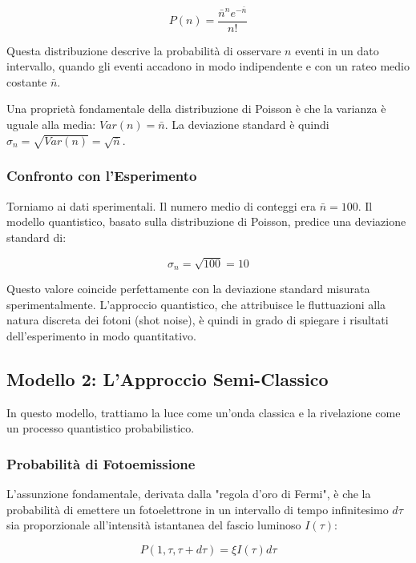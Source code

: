 \begin{equation}
 P(n) = \frac{\bar{n}^n e^{-\bar{n}}}{n!}
\end{equation}

Questa distribuzione descrive la probabilità di osservare $n$ eventi in un dato intervallo, quando gli eventi accadono in modo indipendente e con un rateo medio costante $\bar{n}$.

Una proprietà fondamentale della distribuzione di Poisson è che la varianza è uguale alla media:
$Var(n) = \bar{n}$.
La deviazione standard è quindi $\sigma_n = \sqrt{Var(n)} = \sqrt{\bar{n}}$.

\subsubsection*{Confronto con l'Esperimento}
Torniamo ai dati sperimentali. Il numero medio di conteggi era $\bar{n} = 100$. Il modello quantistico, basato sulla distribuzione di Poisson, predice una deviazione standard di:

\begin{equation}
 \sigma_n = \sqrt{100} = 10
\end{equation}

Questo valore coincide perfettamente con la deviazione standard misurata sperimentalmente. L'approccio quantistico, che attribuisce le fluttuazioni alla natura discreta dei fotoni (shot noise), è quindi in grado di spiegare i risultati dell'esperimento in modo quantitativo.

\subsection{Modello 2: L'Approccio Semi-Classico}

In questo modello, trattiamo la luce come un'onda classica e la rivelazione come un processo quantistico probabilistico.

\subsubsection*{Probabilità di Fotoemissione}
L'assunzione fondamentale, derivata dalla "regola d'oro di Fermi", è che la probabilità di emettere un fotoelettrone in un intervallo di tempo infinitesimo $d\tau$ sia proporzionale all'intensità istantanea del fascio luminoso $I(\tau)$:

\begin{equation}
 P(1, \tau, \tau+d\tau) = \xi I(\tau) d\tau
\end{equation}

